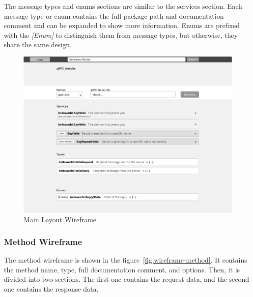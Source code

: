 The message types and enums sections are similar to the services section.
Each message type or enum contains the full package path and documentation comment and can be expanded to show more information.
Enums are prefixed with the \textit{[Enum]} to distinguish them from message types, but otherwise, they share the same design.


\begin{figure}[hbt!]
    \centering
    \captionsetup{justification=centering}
    \includegraphics[width=1.0\textwidth]{images/design/wireframes/main-layout}
    \caption{Main Layout Wireframe}
    \label{fig:wireframe-main-layout}
\end{figure}

\subsubsection{Method Wireframe}
The method wireframe is shown in the figure~\ref{fig:wireframe-method}.
It contains the method name, type, full documentation comment, and options.
Then, it is divided into two sections.
The first one contains the request data, and the second one contains the response data.

